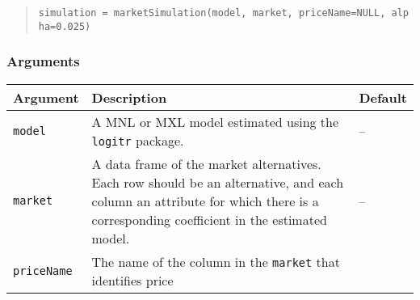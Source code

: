 \documentclass[article]{jss}
\begin{document}
\begin{quote}
\texttt{simulation\ =\ marketSimulation(model,\ market,\ priceName=NULL,\ alpha=0.025)}
\end{quote}

\hypertarget{arguments-1}{%
\subsubsection{Arguments}\label{arguments-1}}

\begin{longtable}[]{@{}lll@{}}
\toprule
\begin{minipage}[b]{0.14\columnwidth}\raggedright
Argument\strut
\end{minipage} & \begin{minipage}[b]{0.66\columnwidth}\raggedright
Description\strut
\end{minipage} & \begin{minipage}[b]{0.11\columnwidth}\raggedright
Default\strut
\end{minipage}\tabularnewline
\midrule
\endhead
\begin{minipage}[t]{0.14\columnwidth}\raggedright
\texttt{model}\strut
\end{minipage} & \begin{minipage}[t]{0.66\columnwidth}\raggedright
A MNL or MXL model estimated using the \texttt{logitr} package.\strut
\end{minipage} & \begin{minipage}[t]{0.11\columnwidth}\raggedright
--\strut
\end{minipage}\tabularnewline
\begin{minipage}[t]{0.14\columnwidth}\raggedright
\texttt{market}\strut
\end{minipage} & \begin{minipage}[t]{0.66\columnwidth}\raggedright
A data frame of the market alternatives. Each row should be an
alternative, and each column an attribute for which there is a
corresponding coefficient in the estimated model.\strut
\end{minipage} & \begin{minipage}[t]{0.11\columnwidth}\raggedright
--\strut
\end{minipage}\tabularnewline
\begin{minipage}[t]{0.14\columnwidth}\raggedright
\texttt{priceName}\strut
\end{minipage} & \begin{minipage}[t]{0.66\columnwidth}\raggedright
The name of the column in the \texttt{market} that identifies price

\end{minipage}
\end{longtable}
\end{document}
